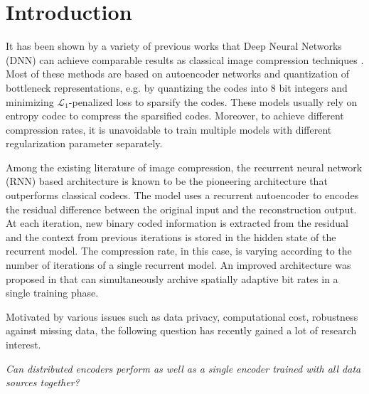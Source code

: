 \documentclass[10pt,twocolumn,letterpaper]{article}
\begin{document}
\section{Introduction}
It has been shown by a variety of previous works that Deep Neural Networks (DNN) can achieve comparable results as classical image compression techniques \cite{toderici2015variable,balle2016end,gregor2016towards,toderici2017full,theis2017lossy,johnston2017improved,liu2018cnn}. Most of these methods are based on autoencoder networks and quantization of bottleneck representations, e.g. by quantizing the codes into 8 bit integers and minimizing $\mathcal{L}_1$-penalized loss to sparsify the codes. These models usually rely on entropy codec to compress the sparsified codes. Moreover, to achieve different compression rates, it is unavoidable to train multiple models with different regularization parameter separately.

Among the existing literature of image compression, the recurrent neural network (RNN) based architecture \cite{toderici2015variable} is known to be the pioneering architecture that outperforms classical codecs. The model uses a recurrent autoencoder to encodes the residual difference between the original input and the reconstruction output. At each iteration, new binary coded information is extracted from the residual and the context from previous iterations is stored in the hidden state of the recurrent model. The compression rate, in this case, is varying according to the number of iterations of a single recurrent model. An improved architecture was proposed in \cite{johnston2017improved} that can simultaneously archive spatially adaptive bit rates in a single training phase. 

Motivated by various issues such as data privacy, computational cost, robustness against missing data, the following question has recently gained a lot of research interest. 

\textit{Can distributed encoders perform as well as a single encoder trained with all data sources together?} 
\end{document}
